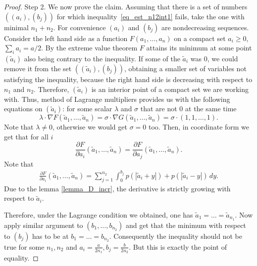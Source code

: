 \documentclass{amsart}
\theoremstyle{remark}
\numberwithin{equation}{section}
\numberwithin{figure}{section}
\begin{document}
\begin{proof}
			
{\sc Step 2}. We now prove the claim. Assuming that there is a set of numbers $((a_i), (b_j))$ for which  inequality~\eqref{eq_est_n12int1} fails, take the one with minimal $n_1+n_2$. For convenience $(a_i)$ and $(b_j)$ are nondecreasing sequences. Consider the left hand side as a function $F(a_1, \ldots, a_n)$ on a compact set $a_i \geq 0$, $\sum_i a_i = a/2$. By the extreme value theorem $F$ attains its minimum at some point $(\tilde a_i)$ also being contrary to the inequality. If some of the $\tilde a_i$ was $0$, we could remove it from the set $((\tilde a_i), (b_j))$, obtaining a smaller set of variables not satisfying the inequality, because the right hand side is decreasing with respect to $n_1$ and $n_2$. Therefore, $(\tilde a_i)$ is an interior point of a compact set we are working with. Thus, method of Lagrange multipliers provides us with the following equations on $(\tilde a_i)$: for some scalar $\lambda$ and $\sigma$ that are not $0$ at the same time
		\[
		\lambda \cdot \nabla F(\tilde a_1, \ldots, \tilde a_n) = \sigma \cdot \nabla G(\tilde a_1, \ldots, \tilde a_n) = \sigma \cdot (1, 1, \ldots, 1).
		\]
		Note that $\lambda \neq 0$, otherwise we would get $\sigma = 0$ too. Then, in coordinate form we get that for all $i$
		\[
		\frac{\partial F}{\partial a_i} (\tilde a_1, \ldots, \tilde a_n)= \frac{\partial F}{\partial a_j} (\tilde a_1, \ldots, \tilde a_n).
		\]
		Note that 
		\begin{eqnarray*}
			\frac{\partial F}{\partial a_i} (\tilde a_1, \ldots, \tilde a_n) 
			= \sum_{j=1}^{n_2} \int_{0}^{b_j} p(|\tilde a_i+y|)+p(|\tilde a_i-y|)\,dy.
		\end{eqnarray*}
		Due to the lemma \ref{lemma_D_incr}, the derivative is strictly growing with respect to $\tilde a_i$.		
		
		Therefore, under the Lagrange condition we obtained, one has $\tilde a_1 = \ldots = \tilde a_{n_1}$. Now apply similar argument to $(b_1, \ldots, b_{n_2})$ and get that the minimum with respect to $(b_j)$ has to be at $b_1 = \ldots = b_{n_2}$. Consequently the inequality should not be true for some $n_1, n_2$ and $a_i = \frac{a}{2n_1}, b_j = \frac{b}{2n_2}$. But this is exactly the point of equality.
	\end{proof}
\end{document}
